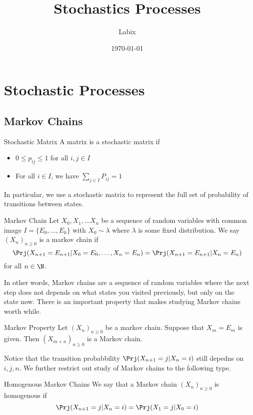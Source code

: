 \documentclass[a4paper]{article}
\title{Stochastics Processes}
\author{Labix}
\date{\today}
\begin{document}
\maketitle
\begin{abstract}
\end{abstract}
\tableofcontents
\pagebreak

\section{Stochastic Processes}
\subsection{Markov Chains}
\begin{defn}{Stochastic Matrix}{} A matrix is a stochastic matrix if 
\begin{itemize}
\item $0\leq p_{ij}\leq 1$ for all $i,j\in I$
\item For all $i\in I$, we have $\sum_{j\in I}P_{ij}=1$
\end{itemize}
In particular, we use a stochastic matrix to represent the full set of probability of transitions between states. 
\end{defn}

\begin{defn}{Markov Chain}{} Let $X_0,X_1,\dots X_n$ be a sequence of random variables with common image $I=\{E_0,\dots,E_k\}$ with $X_0\sim\lambda$ where $\lambda$ is some fixed distribution. We say $(X_n)_{n\geq 0}$ is a markov chain if $$\Prj(X_{n+1}=E_{n+1}|X_0=E_0,\dots,X_n=E_n)=\Prj(X_{n+1}=E_{n+1}|X_n=E_n)$$ for all $n\in\N$. 
\end{defn}

In other words, Markov chains are a sequence of random variables where the next step does not depends on what states you visited previously, but only on the state now. There is an important property that makes studying Markov chains worth while. 

\begin{thm}{Markov Property}{} Let $(X_n)_{n\geq0}$ be a markov chain. Suppose that $X_m=E_m$ is given. Then $(X_{m+n})_{n\geq 0}$ is a Markov chain. 
\end{thm}


Notice that the transition probabbility $\Prj(X_{n+1}=j|X_n=i)$ still depedns on $i,j,n$. We further restrict out study of Markov chains to the following type. 

\begin{defn}{Homogenous Markov Chains}{} We say that a Markov chain $(X_n)_{n\geq 0}$ is homogenous if $$\Prj(X_{n+1}=j|X_n=i)=\Prj(X_1=j|X_0=i)$$
\end{defn}
\end{document}
